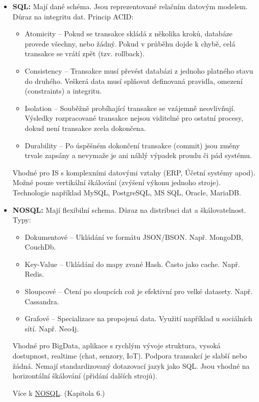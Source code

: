 \begin{itemize}
    \item \textbf{SQL:} Mají dané schéma. Jsou reprezentované relačním 
    datovým modelem. Důraz na integritu dat. Princip ACID:
    \begin{itemize}
        \item Atomicity -- Pokud se transakce skládá z několika kroků, databáze provede všechny, nebo žádný. Pokud v průběhu dojde k chybě, celá transakce se vrátí zpět (tzv. rollback).
        \item Consistency -- Transakce musí převést databázi z jednoho platného stavu do druhého. Veškerá data musí splňovat definovaná pravidla, omezení (constraints) a integritu.
        \item Isolation -- Souběžně probíhající transakce se vzájemně neovlivňují. Výsledky rozpracované transakce nejsou viditelné pro ostatní procesy, dokud není transakce zcela dokončena.
        \item Durability -- Po úspěšném dokončení transakce (commit) jsou změny trvale zapsány a nevymaže je ani náhlý výpadek proudu či pád systému.
    \end{itemize}
    Vhodné pro IS s komplexními datovými vztahy (ERP, Účetní systémy apod).
	Možné pouze vertikální škálování (zvýšení výkonu jednoho stroje).
    Technologie například MySQL, PostgreSQL, MS SQL, Oracle, MariaDB.
    \item \textbf{NOSQL:} Mají flexibilní schema. Důraz na distribuci dat a škálovatelnost.
    Typy:
    \begin{itemize}
        \item Dokumentové -- Ukládání ve formátu JSON/BSON. Např. MongoDB, CouchDb.
        \item Key-Value -- Ukládání do mapy zvané Hash. Často jako cache. Např. Redis.
        \item Sloupcové -- Čtení po sloupcích což je efektivní pro velké datasety. Např. Cassandra.
        \item Grafové -- Specializace na propojená data. Využití například u sociálních sítí. Např. Neo4j.
    \end{itemize}
    Vhodné pro BigData, aplikace s rychlým vývoje struktura, vysoká dostupnost, realtime (chat, senzory, IoT).
    Podpora transakcí je slabší nebo žádná. Nemají standardizovaný dotazovací
    jazyk jako SQL. Jsou vhodné na horizontální škálování (přidání dalších strojů).
  
    Více k \hyperref[sec:nosql]{NOSQL}. (Kapitola 6.)
    \label{sub:dv}

\end{itemize}

